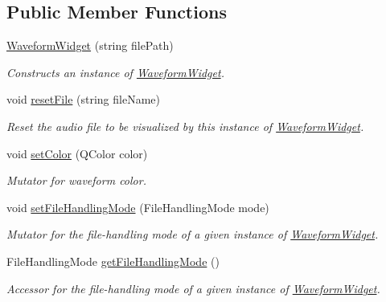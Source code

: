 \subsection*{Public Member Functions}
\begin{DoxyCompactItemize}
\item 
\hyperlink{classWaveformWidget_a427abef421a28dd5b97536b3a890c754}{WaveformWidget} (string filePath)
\begin{DoxyCompactList}\small\item\em Constructs an instance of \hyperlink{classWaveformWidget}{WaveformWidget}. \item\end{DoxyCompactList}\item 
void \hyperlink{classWaveformWidget_aaa9badf231a5d856b453f4d6da87d9b1}{resetFile} (string fileName)
\begin{DoxyCompactList}\small\item\em Reset the audio file to be visualized by this instance of \hyperlink{classWaveformWidget}{WaveformWidget}. \item\end{DoxyCompactList}\item 
void \hyperlink{classWaveformWidget_a51a16e62c5e5deae1a4fd4073dedab2d}{setColor} (QColor color)
\begin{DoxyCompactList}\small\item\em Mutator for waveform color. \item\end{DoxyCompactList}\item 
void \hyperlink{classWaveformWidget_a65b983a6c1a6325b3cf84b8ae6fa8a69}{setFileHandlingMode} (FileHandlingMode mode)
\begin{DoxyCompactList}\small\item\em Mutator for the file-\/handling mode of a given instance of \hyperlink{classWaveformWidget}{WaveformWidget}. \item\end{DoxyCompactList}\item 
FileHandlingMode \hyperlink{classWaveformWidget_aae9f34038d4b391477141df24996b616}{getFileHandlingMode} ()
\begin{DoxyCompactList}\small\item\em Accessor for the file-\/handling mode of a given instance of \hyperlink{classWaveformWidget}{WaveformWidget}. \item\end{DoxyCompactList}\end{DoxyCompactItemize}
